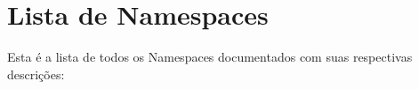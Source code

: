 \section{\-Lista de \-Namespaces}
\-Esta é a lista de todos os \-Namespaces documentados com suas respectivas descrições\-:\begin{DoxyCompactList}
\item{}
\end{DoxyCompactList}
